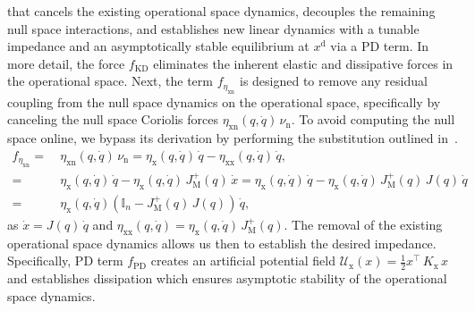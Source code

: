 that cancels the existing operational space dynamics, decouples the remaining null space interactions, and establishes new linear dynamics with a tunable impedance and an asymptotically stable equilibrium at $x^\mathrm{d}$ via a PD term. In more detail, the force $f_\mathrm{KD}$ eliminates the inherent elastic and dissipative forces in the operational space. Next, the term $f_{\eta_\mathrm{xn}}$ is designed to remove any residual coupling from the null space dynamics on the operational space, specifically by canceling the null space Coriolis forces $\eta_\mathrm{xn}(q,\dot{q}) \, \nu_\mathrm{n}$. To avoid computing the null space online, we bypass its derivation by performing the substitution outlined in~\citep{ott2008cartesian, della2020model}.
\begin{equation}
\begin{split}
    f_{\eta_\mathrm{xn}} =& \: \eta_\mathrm{xn}(q,\dot{q}) \, \nu_\mathrm{n} = \eta_\mathrm{x}(q,\dot{q}) \, \dot{q} - \eta_\mathrm{xx}(q,\dot{q}) \, \dot{q},\\
    =& \: \eta_\mathrm{x}(q,\dot{q}) \, \dot{q} - \eta_\mathrm{x}(q,\dot{q}) \, J_\mathrm{M}^+(q) \, \dot{x} = \eta_\mathrm{x}(q,\dot{q}) \, \dot{q} - \eta_\mathrm{x}(q,\dot{q}) \, J_\mathrm{M}^+(q) \, J(q) \, \dot{q}\\
    =& \: \eta_\mathrm{x}(q,\dot{q}) \left ( \mathbb{I}_n - J_\mathrm{M}^{+}(q) \, J(q)  \right ) \, \dot{q},
\end{split}
\end{equation}
as $\dot{x} = J(q) \, \dot{q}$ and $\eta_\mathrm{xx}(q,\dot{q}) = \eta_\mathrm{x}(q,\dot{q}) \, J_\mathrm{M}^+(q)$.
The removal of the existing operational space dynamics allows us then to establish the desired impedance. Specifically, PD term $f_\mathrm{PD}$ creates an artificial potential field $\mathcal{U}_\mathrm{x}(x) = \frac{1}{2}x^\top \, K_\mathrm{x} \, x$ and establishes dissipation which ensures asymptotic stability of the operational space dynamics.
